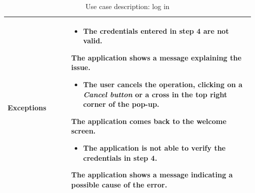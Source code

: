 \begin{table}[H]
\begin{tabular}{@{}p{0.25\linewidth} p{0.72\linewidth}@{}}
		\textbf{Exceptions}         & \begin{itemize}[leftmargin=.4cm,noitemsep,topsep=0pt,before=\vspace{-3mm}]
		   \item The credentials entered in step 4 are not valid.
		\end{itemize}
		The application shows a message explaining the issue.
	    \begin{itemize}[leftmargin=.4cm,noitemsep,topsep=0pt]
		   \item The user cancels the operation, clicking on a \textit{Cancel button} or a cross in the top right corner of the pop-up.
		\end{itemize}
		The application comes back to the welcome screen.
	    \begin{itemize}[leftmargin=.4cm,noitemsep,topsep=0pt]
		   \item The application is not able to verify the credentials in step 4.
		\end{itemize}
		The application shows a message indicating a possible cause of the error.
		\\\bottomrule
	\end{tabular}
	\caption{Use case description: log in} 
\end{table}


